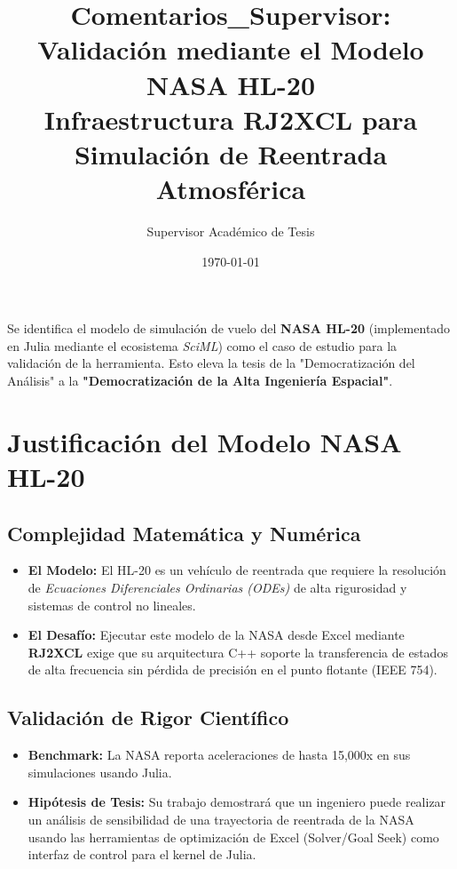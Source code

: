 \documentclass[12pt]{article}
\title{Comentarios\_Supervisor: Validación mediante el Modelo NASA HL-20\\ \large Infraestructura RJ2XCL para Simulación de Reentrada Atmosférica}
\author{Supervisor Académico de Tesis}
\date{\today}
\begin{document}
\maketitle

\begin{tcolorbox}[colframe=black!80!blue, title=Punto de Inflexión Doctoral]
Se identifica el modelo de simulación de vuelo del \textbf{NASA HL-20} (implementado en Julia mediante el ecosistema \textit{SciML}) como el caso de estudio para la validación de la herramienta. Esto eleva la tesis de la "Democratización del Análisis" a la \textbf{"Democratización de la Alta Ingeniería Espacial"}.
\end{tcolorbox}

\section{Justificación del Modelo NASA HL-20}

\subsection{Complejidad Matemática y Numérica}
\begin{itemize}
    \item \textbf{El Modelo:} El HL-20 es un vehículo de reentrada que requiere la resolución de \textit{Ecuaciones Diferenciales Ordinarias (ODEs)} de alta rigurosidad y sistemas de control no lineales. 
    \item \textbf{El Desafío:} Ejecutar este modelo de la NASA desde Excel mediante \textbf{RJ2XCL} exige que su arquitectura C++ soporte la transferencia de estados de alta frecuencia sin pérdida de precisión en el punto flotante (IEEE 754).
\end{itemize}

\subsection{Validación de Rigor Científico}
\begin{itemize}
    \item \textbf{Benchmark:} La NASA reporta aceleraciones de hasta 15,000x en sus simulaciones usando Julia. 
    \item \textbf{Hipótesis de Tesis:} Su trabajo demostrará que un ingeniero puede realizar un análisis de sensibilidad de una trayectoria de reentrada de la NASA usando las herramientas de optimización de Excel (Solver/Goal Seek) como interfaz de control para el kernel de Julia.
\end{itemize}
\end{document}
